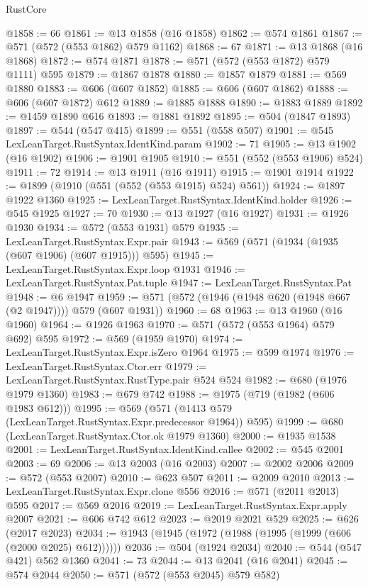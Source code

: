 \begin{lexlean}{RustCore}
\begin{coremodule}
@1858 := 66
@1861 := @13 @1858 (@16 @1858)
@1862 := @574 @1861
@1867 := @571 (@572 (@553 @1862) @579 @1162)
@1868 := 67
@1871 := @13 @1868 (@16 @1868)
@1872 := @574 @1871
@1878 := @571 (@572 (@553 @1872) @579 @1111) @595
@1879 := @1867 @1878
@1880 := @1857 @1879
@1881 := @569 @1880
@1883 := @606 (@607 @1852)
@1885 := @606 (@607 @1862)
@1888 := @606 (@607 @1872) @612
@1889 := @1885 @1888
@1890 := @1883 @1889
@1892 := @1459 @1890 @616
@1893 := @1881 @1892
@1895 := @504 (@1847 @1893)
@1897 := @544 (@547 @415)
@1899 := @551 (@558 @507)
@1901 := @545 LexLeanTarget.RustSyntax.IdentKind.param
@1902 := 71
@1905 := @13 @1902 (@16 @1902)
@1906 := @1901 @1905
@1910 := @551 (@552 (@553 @1906) @524)
@1911 := 72
@1914 := @13 @1911 (@16 @1911)
@1915 := @1901 @1914
@1922 := @1899 (@1910 (@551 (@552 (@553 @1915) @524) @561))
@1924 := @1897 @1922 @1360
@1925 := LexLeanTarget.RustSyntax.IdentKind.holder
@1926 := @545 @1925
@1927 := 70
@1930 := @13 @1927 (@16 @1927)
@1931 := @1926 @1930
@1934 := @572 (@553 @1931) @579
@1935 := LexLeanTarget.RustSyntax.Expr.pair
@1943 := @569 (@571 (@1934 (@1935 (@607 @1906) (@607 @1915))) @595)
@1945 := LexLeanTarget.RustSyntax.Expr.loop @1931
@1946 := LexLeanTarget.RustSyntax.Pat.tuple
@1947 := LexLeanTarget.RustSyntax.Pat
@1948 := @6 @1947
@1959 := @571 (@572 (@1946 (@1948 @620 (@1948 @667 (@2 @1947)))) @579 (@607 @1931))
@1960 := 68
@1963 := @13 @1960 (@16 @1960)
@1964 := @1926 @1963
@1970 := @571 (@572 (@553 @1964) @579 @692) @595
@1972 := @569 (@1959 @1970)
@1974 := LexLeanTarget.RustSyntax.Expr.isZero @1964
@1975 := @599 @1974
@1976 := LexLeanTarget.RustSyntax.Ctor.err
@1979 := LexLeanTarget.RustSyntax.RustType.pair @524 @524
@1982 := @680 (@1976 @1979 @1360)
@1983 := @679 @742
@1988 := @1975 (@719 (@1982 (@606 @1983 @612)))
@1995 := @569 (@571 (@1413 @579 (LexLeanTarget.RustSyntax.Expr.predecessor @1964)) @595)
@1999 := @680 (LexLeanTarget.RustSyntax.Ctor.ok @1979 @1360)
@2000 := @1935 @1538
@2001 := LexLeanTarget.RustSyntax.IdentKind.callee
@2002 := @545 @2001
@2003 := 69
@2006 := @13 @2003 (@16 @2003)
@2007 := @2002 @2006
@2009 := @572 (@553 @2007)
@2010 := @623 @507
@2011 := @2009 @2010
@2013 := LexLeanTarget.RustSyntax.Expr.clone @556
@2016 := @571 (@2011 @2013) @595
@2017 := @569 @2016
@2019 := LexLeanTarget.RustSyntax.Expr.apply @2007
@2021 := @606 @742 @612
@2023 := @2019 @2021 @529
@2025 := @626 (@2017 @2023)
@2034 := @1943 (@1945 (@1972 (@1988 (@1995 (@1999 (@606 (@2000 @2025) @612))))))
@2036 := @504 (@1924 @2034)
@2040 := @544 (@547 @421) @562 @1360
@2041 := 73
@2044 := @13 @2041 (@16 @2041)
@2045 := @574 @2044
@2050 := @571 (@572 (@553 @2045) @579 @582)

\end{coremodule}
\end{lexlean}
